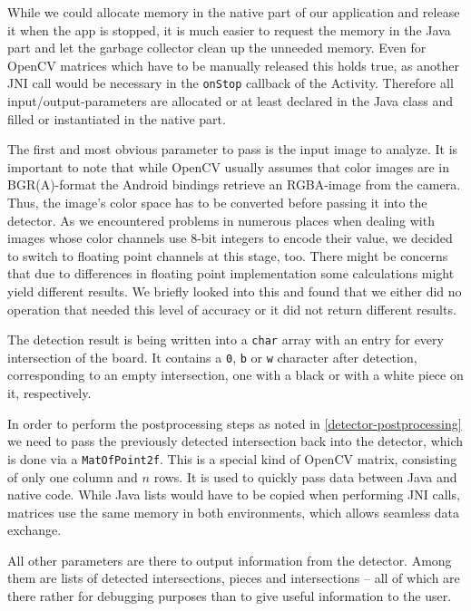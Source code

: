	While we could allocate memory in the native part of our application and release it when the app is stopped, it is much easier to request the memory in the Java part and let the garbage collector clean up the unneeded memory. Even for OpenCV matrices which have to be manually released this holds true, as another JNI call would be necessary in the \texttt{onStop} callback of the Activity. Therefore all input/output-parameters are allocated or at least declared in the Java class and filled or instantiated in the native part.

	The first and most obvious parameter to pass is the input image to analyze. It is important to note that while OpenCV usually assumes that color images are in BGR(A)-format the Android bindings retrieve an RGBA-image from the camera. Thus, the image's color space has to be converted before passing it into the detector. As we encountered problems in numerous places when dealing with images whose color channels use 8-bit integers to encode their value, we decided to switch to floating point channels at this stage, too. There might be concerns that due to differences in floating point implementation some calculations might yield different results. We briefly looked into this and found that we either did no operation that needed this level of accuracy or it did not return different results.

	The detection result is being written into a \texttt{char} array with an entry for every intersection of the board. It contains a \texttt{0}, \texttt{b} or \texttt{w} character after detection, corresponding to an empty intersection, one with a black or with a white piece on it, respectively.

	In order to perform the postprocessing steps as noted in \autoref{detector-postprocessing} we need to pass the previously detected intersection back into the detector, which is done via a \texttt{MatOfPoint2f}. This is a special kind of OpenCV matrix, consisting of only one column and $n$ rows. It is used to quickly pass data between Java and native code. While Java lists would have to be copied when performing JNI calls, matrices use the same memory in both environments, which allows seamless data exchange.

	All other parameters are there to output information from the detector. Among them are lists of detected intersections, pieces and intersections -- all of which are there rather for debugging purposes than to give useful information to the user.

